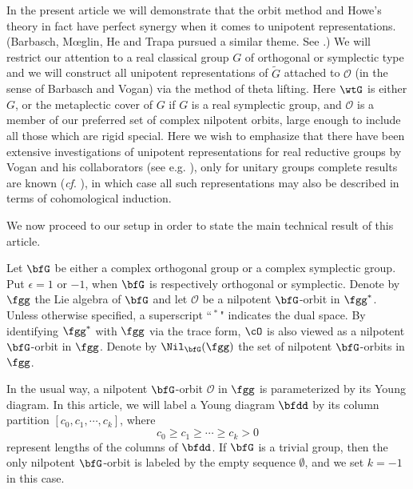 \documentclass[12pt,a4paper]{amsart}
\newcommand{\CO}{{\mathcal {O}}}
\newcommand{\wt}{\widetilde}
\renewcommand{\vsp}{{\vspace{0.2in}}}
\numberwithin{equation}{section}
\theoremstyle{remark}
\begin{document}
In the present article we will demonstrate that the orbit method and Howe's theory in fact have perfect synergy when it comes to unipotent representations. (Barbasch, M{\oe}glin, He and Trapa pursued a similar theme. See \cite{B17,Mo17,He,Tr}.) We will restrict our attention to a real classical group $G$ of orthogonal or symplectic type and we will construct all unipotent representations of $\wt{G}$ attached to $\CO$ (in the sense of Barbasch and Vogan) via the method of theta lifting. Here $\wtG$ is either $G$, or the metaplectic cover of $G$ if $G$ is a real symplectic
group, and $\CO$ is a member of our preferred set of complex nilpotent orbits, large enough to include all those which are rigid special. Here we wish to emphasize that there have been extensive investigations of unipotent representations for real reductive groups by Vogan and his collaborators (see e.g. \cite{VoBook,Vo89,ABV}),
only for unitary groups complete results are known (\emph{cf}. \cite{BV83, Tr}), in which case all such representations may also be described in terms of cohomological induction.
\vsp


We now proceed to our setup in order to state the main technical result of this article.

Let $\bfG$ be either a complex orthogonal group or a
complex symplectic group. Put $\epsilon=1$ or $-1$, when $\bfG$ is respectively
orthogonal or symplectic. Denote by $\fgg$ the Lie algebra of $\bfG$ and let
$\CO$ be a nilpotent $\bfG$-orbit in $\fgg^*$. Unless otherwise specified, a
superscript ``$\,^*\,$" indicates the dual space.  By identifying $\fgg^*$ with
$\fgg$ via the trace form, $\cO$ is also viewed as a nilpotent $\bfG$-orbit in
$\fgg$. Denote by $\Nil_{\bfG}(\fgg)$ the set of nilpotent $\bfG$-orbits in
$\fgg$.

In the usual way, a nilpotent $\bfG$-orbit $\CO$ in $\fgg$ is parameterized by
its Young diagram. In this article, we will label a Young diagram $\bfdd$ by its
column partition $[c_0,c_1,\cdots, c_k]$, where
\[%
  c_0\geq c_1\geq \cdots \geq c_k> 0
\]%
represent lengths of the columns of $\bfdd$. If $\bfG$ is a trivial group, then the only nilpotent $\bfG$-orbit is labeled by the empty sequence $\emptyset$, and we set  $k=-1$ in this case.
\end{document}
